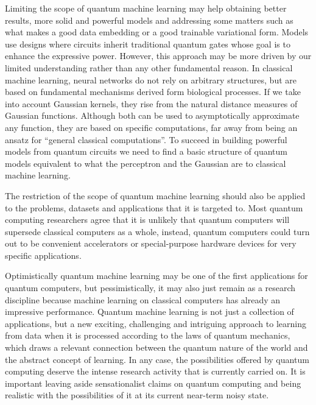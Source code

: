 Limiting the scope of quantum machine learning may help obtaining better results, more solid and powerful models and addressing some matters such as what makes a good data embedding or a good trainable variational form. Models use designs where circuits inherit traditional quantum gates whose goal is to enhance the expressive power. However, this approach may be more driven by our limited understanding rather than any other fundamental reason. In classical machine learning, neural networks do not rely on arbitrary structures, but are based on fundamental mechanisms derived form biological processes. If we take into account Gaussian kernels, they rise from the natural distance measures of Gaussian functions. Although both can be used to asymptotically approximate any function, they are based on specific computations, far away from being an ansatz for ``general classical computations''. To succeed in building powerful models from quantum circuits we need to find a basic structure of quantum models equivalent to what the perceptron and the Gaussian are to classical machine learning.

The restriction of the scope of quantum machine learning should also be applied to the problems, datasets and applications that it is targeted to. Most quantum computing researchers agree that it is unlikely that quantum computers will supersede classical computers as a whole, instead, quantum computers could turn out to be convenient accelerators or special-purpose hardware devices for very specific applications.

Optimistically quantum machine learning may be one of the first applications for quantum computers, but pessimistically, it may also just remain as a research discipline because machine learning on classical computers has already an impressive performance. Quantum machine learning is not just a collection of applications, but a new exciting, challenging and intriguing approach to learning from data when it is processed according to the laws of quantum mechanics, which draws a relevant connection between the quantum nature of the world and the abstract concept of learning. In any case, the possibilities offered by quantum computing deserve the intense research activity that is currently carried on. It is important leaving aside sensationalist claims on quantum computing and being realistic with the possibilities of it at its current near-term noisy state.


\endinput
